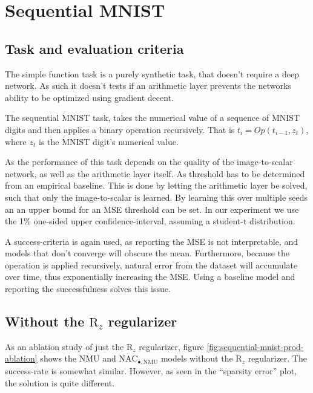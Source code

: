 \section{Sequential MNIST}

\subsection{Task and evaluation criteria}
The simple function task is a purely synthetic task, that doesn't require a deep network. As such it doesn't tests if an arithmetic layer prevents the networks ability to be optimized using gradient decent.

The sequential MNIST task, takes the numerical value of a sequence of MNIST digits and then applies a binary operation recursively. That is $t_i = Op(t_{i-1}, z_t)$, where $z_t$ is the MNIST digit's numerical value.

As the performance of this task depends on the quality of the image-to-scalar network, as well as the arithmetic layer itself. As threshold has to be determined from an empirical baseline. This is done by letting the arithmetic layer be solved, such that only the image-to-scalar is learned. By learning this over multiple seeds an an upper bound for an MSE threshold can be set. In our experiment we use the 1\% one-sided upper confidence-interval, assuming a student-t distribution.

A success-criteria is again used, as reporting the MSE is not interpretable, and models that don't converge will obscure the mean. Furthermore, because the operation is applied recursively, natural error from the dataset will accumulate over time, thus exponentially increasing the MSE. Using a baseline model and reporting the successfulness solves this issue.

\subsection{Without the $\mathrm{R}_z$ regularizer}
\label{sec:appendix:sequential-mnist:ablation}

As an ablation study of just the $\mathrm{R}_z$ regularizer, figure \ref{fig:sequential-mnist-prod-ablation} shows the NMU and $\mathrm{NAC}_{\bullet,\mathrm{NMU}}$ models without the $\mathrm{R}_z$ regularizer. The success-rate is somewhat similar. However, as seen in the ``sparsity error'' plot, the solution is quite different.

